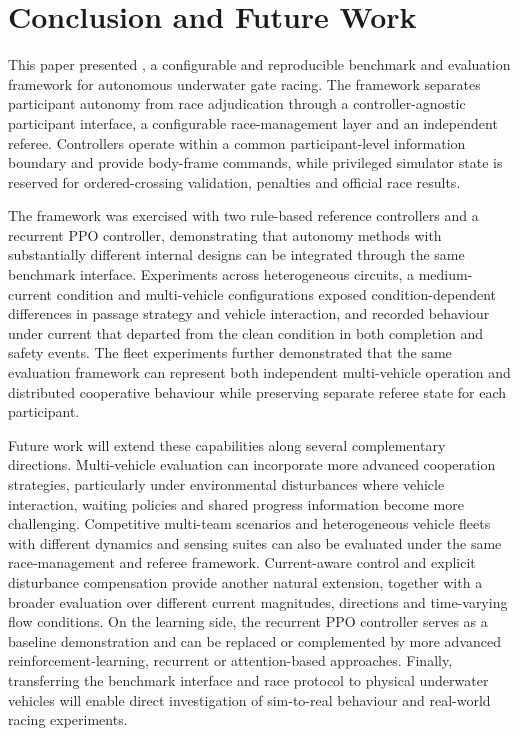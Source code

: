 \section{Conclusion and Future Work}
\label{sec:conclusion}

This paper presented \mra{}, a configurable and reproducible benchmark and
evaluation framework for autonomous underwater gate racing. The framework
separates participant autonomy from race adjudication through a
controller-agnostic participant interface, a configurable race-management layer
and an independent referee. Controllers operate within a common
participant-level information boundary and provide body-frame commands, while
privileged simulator state is reserved for ordered-crossing validation,
penalties and official race results.

The framework was exercised with two rule-based reference controllers and a
recurrent PPO controller, demonstrating that autonomy methods with substantially
different internal designs can be integrated through the same benchmark
interface. Experiments across heterogeneous circuits, a medium-current
condition and multi-vehicle configurations exposed condition-dependent
differences in passage strategy and vehicle interaction, and recorded behaviour
under current that departed from the clean condition in both completion and
safety events.
The fleet experiments further demonstrated that the same evaluation framework
can represent both independent multi-vehicle operation and distributed
cooperative behaviour while preserving separate referee state for each
participant.

Future work will extend these capabilities along several complementary
directions. Multi-vehicle evaluation can incorporate more advanced cooperation
strategies, particularly under environmental disturbances where vehicle
interaction, waiting policies and shared progress information become more
challenging. Competitive multi-team scenarios and heterogeneous vehicle fleets
with different dynamics and sensing suites can also be evaluated under the same
race-management and referee framework. Current-aware control and explicit
disturbance compensation provide another natural extension, together with a
broader evaluation over different current magnitudes, directions and
time-varying flow conditions. On the learning side, the recurrent PPO controller
serves as a baseline demonstration and can be replaced or complemented by more
advanced reinforcement-learning, recurrent or attention-based approaches.
Finally, transferring the benchmark interface and race protocol to physical
underwater vehicles will enable direct investigation of sim-to-real behaviour
and real-world racing experiments.
